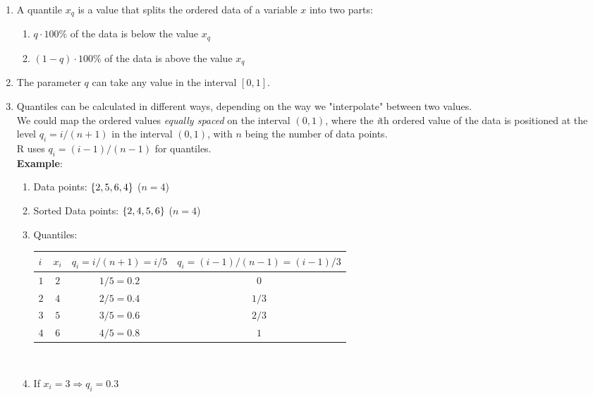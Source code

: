 \begin{enumerate}
    \item A quantile $x_q$ is a value that splits the ordered data of a variable $x$ into two parts: \cite{statistics/book/Statistics-for-Data-Scientists/Maurits-Kaptein}
    \begin{enumerate}
        \item $q \cdot 100\%$ of the data is below the value $x_q$

        \item $(1 - q) \cdot 100\%$ of the data is above the value $x_q$
    \end{enumerate}
    
    \item The parameter $q$ can take any value in the interval $[0, 1]$. \cite{statistics/book/Statistics-for-Data-Scientists/Maurits-Kaptein}

    \item Quantiles can be calculated in different ways, depending on the way we "interpolate" between two values. \cite{statistics/book/Statistics-for-Data-Scientists/Maurits-Kaptein} \\
    We could map the ordered values \textit{equally spaced} on the interval $(0, 1)$, where the \textit{i}th ordered value of the data is positioned at the level $q_i = {i}/{(n + 1)}$ in the interval $(0, 1)$, with $n$ being the number of data points. \cite{statistics/book/Statistics-for-Data-Scientists/Maurits-Kaptein} \\
    R uses $q_i = (i - 1)/(n - 1)$ for quantiles. \cite{statistics/book/Statistics-for-Data-Scientists/Maurits-Kaptein} \\
    \textbf{Example}: \cite{statistics/book/Statistics-for-Data-Scientists/Maurits-Kaptein}
    \begin{enumerate}
        \item Data points: $\left\{2, 5, 6, 4\right\}$ ($n=4$)
        \item Sorted Data points: $\left\{2, 4, 5, 6\right\}$ ($n=4$)
        \item Quantiles:\\[0.2cm]
        \begin{tabular}{|l|c|c|c|}
            \hline
            $i$ & $x_i$ & $q_i = i/(n+1) = i/5$ & $q_i = (i-1)/(n-1) = (i-1)/3$ \\ [0.1cm]
            \hline
            $1$ & $2$ & $1/5 = 0.2$ & $0$ \\
            $2$ & $4$ & $2/5 = 0.4$ & $1/3$ \\
            $3$ & $5$ & $3/5 = 0.6$ & $2/3$ \\
            $4$ & $6$ & $4/5 = 0.8$ & $1$ \\
            \hline
        \end{tabular}\\

        \item If $x_i = 3 \Rightarrow q_i = 0.3$
    \end{enumerate}
\end{enumerate}




